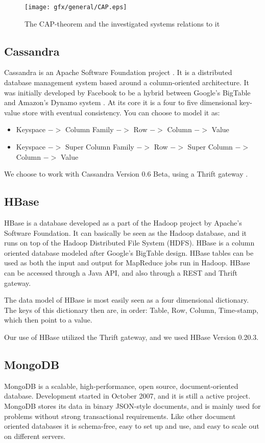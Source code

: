 \begin{figure}
    \centering
    \texttt{[image: gfx/general/CAP.eps]}
    \caption{The CAP-theorem and the investigated systems relations to it}
    \label{fig:cap}
\end{figure}

\subsection{Cassandra}
Cassandra is an Apache Software Foundation project \cite{Cassandra}. It is a distributed database management system based around a column-oriented architecture. It was initially developed by Facebook to be a hybrid between Google's BigTable \cite{BigTable} and Amazon's Dynamo system \cite{Dynamo}. At its core it is a four to five dimensional key-value store with eventual consistency. You can choose to model it as:
\begin{itemize}
\item Keyspace $->$ Column Family $->$ Row $->$ Column $->$ Value
\item Keyspace $->$ Super Column Family $->$ Row $->$ Super Column $->$ Column $->$ Value
\end{itemize}
We choose to work with Cassandra Version 0.6 Beta, using a Thrift gateway \cite{Thrift}.
\subsection{HBase}
HBase is a database developed as a part of the Hadoop project by Apache's Software Foundation. It can basically be seen as the Hadoop database, and it runs on top of the Hadoop Distributed File System (HDFS). HBase is a column oriented database modeled after Google's BigTable design. HBase tables can be used as both the input and output for MapReduce jobs run in Hadoop. HBase can be accessed through a Java API, and also through a REST and Thrift gateway.

The data model of HBase is most easily seen as a four dimensional dictionary. The keys of this dictionary then are, in order: Table, Row, Column, Time-stamp, which then point to a value.

Our use of HBase utilized the Thrift gateway, and we used HBase Version 0.20.3.
\subsection{MongoDB}
MongoDB is a scalable, high-performance, open source, document-oriented database. Development started in October 2007, and it is still a active project. MongoDB stores its data in binary JSON-style documents, and is mainly used for problems without strong transactional requirements. Like other document oriented databases it is schema-free, easy to set up and use, and easy to scale out on different servers.

